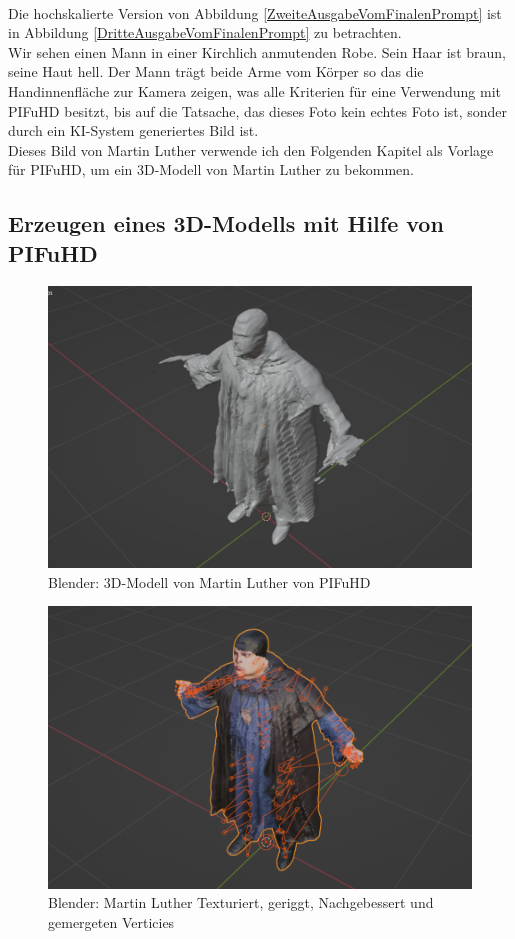 \\
Die hochskalierte Version von Abbildung \ref{ZweiteAusgabeVomFinalenPrompt} ist in Abbildung \ref{DritteAusgabeVomFinalenPrompt} zu betrachten.
\\
Wir sehen einen Mann in einer Kirchlich anmutenden Robe. Sein Haar ist braun, seine Haut hell. Der Mann trägt beide Arme vom Körper so das die Handinnenfläche zur Kamera zeigen, was alle Kriterien für eine Verwendung mit PIFuHD besitzt, bis auf die Tatsache, das dieses Foto kein echtes Foto ist, sonder durch ein KI-System generiertes Bild ist.
\\
Dieses Bild von Martin Luther verwende ich den Folgenden Kapitel als Vorlage für PIFuHD, um ein 3D-Modell von Martin Luther zu bekommen.
\subsection{Erzeugen eines 3D-Modells mit Hilfe von PIFuHD}
\begin{figure}
	\centering
	\includegraphics[width=14cm]{BilderFuerBA/BlenderMLVonPIFuHD105k.png}
	\caption{Blender: 3D-Modell von Martin Luther von PIFuHD}
	\label{BlenderMLVonPIFuHD105k}
\end{figure}
\begin{figure}
	\centering
	\includegraphics[width=14cm]{BilderFuerBA/BlenderMLGeriggtUndTexturiert95k.png}
	\caption{Blender: Martin Luther Texturiert, geriggt, Nachgebessert und gemergeten Verticies}
	\label{BlenderMLGeriggtUndTexturiert95k}
\end{figure}
